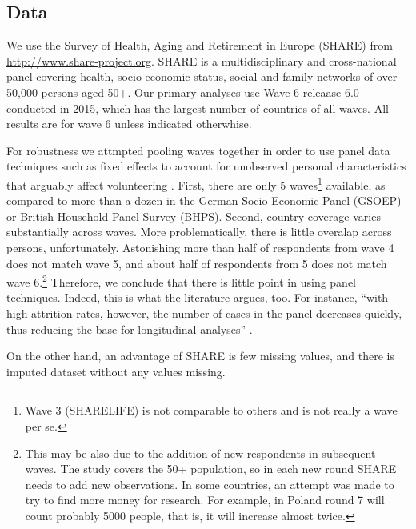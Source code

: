 \documentclass[10pt, letterpaper]{article}
\begin{document}
\begin{spacing}{1.4}
\section{Data} 

We use the Survey of Health, Aging and Retirement in Europe (SHARE) from
\url{http://www.share-project.org}.
 SHARE is a multidisciplinary and
cross-national panel covering health, socio-economic status,
social and family networks of over 50,000 persons aged 50$+$. Our primary
analyses use %
 Wave 6 releaase 6.0
 conducted  in 2015, which has the largest number of
countries of all waves.  All %
results are for wave 6 unless indicated otherwhise.

For robustness we attmpted pooling waves together in order to use panel data
techniques such as fixed effects to account for unobserved personal
characteristics that arguably affect volunteering \citep{meier08}. 
First, there are only 5 waves\footnote{Wave 3 (SHARELIFE) is not comparable to others and
is not really a wave per se.} available, as compared to more than a
dozen in the German Socio-Economic Panel (GSOEP) or British Household Panel
Survey (BHPS). Second, country coverage varies substantially across waves.
 More problematically, there is little overalap across persons, unfortunately.
Astonishing more than half of respondents from wave 4 does not match wave 5, and
about half of respondents from 5 does not match wave 6.\footnote{%
This may be also due
  to the addition of new respondents in subsequent waves. The study covers the 50+ population,
  so in each new round SHARE needs to add new observations. In some
  countries, an attempt was made to try to find more money for research. For
  example, in Poland round 7 will count probably 5000 people, that is, it will
  increase almost twice.}  Therefore, we conclude
that there is little point in using panel techniques.
%
Indeed, this is what the literature argues, too. For instance, ``with 
high attrition rates, however, the number of cases  in the panel decreases quickly, 
thus  reducing  the  base  for  longitudinal  analyses'' \citep{blom2011sample}. 

On the other hand, an advantage of SHARE is few missing values, 
 and there is imputed dataset without any values missing. %
                                

\end{spacing}
\end{document}
